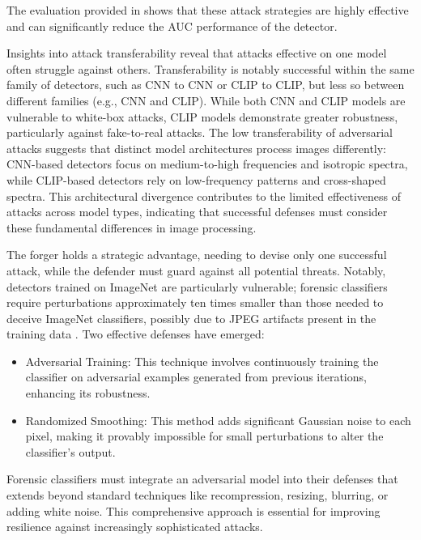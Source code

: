 \documentclass[conference]{IEEEtran} %
\begin{document}
        The evaluation provided in \cite{de2024exploring} shows that these attack strategies are highly effective and can significantly reduce the AUC performance of the detector.
        
        Insights into attack transferability \cite{de2024exploring} reveal that attacks effective on one model often struggle against others. Transferability is notably successful within the same family of detectors, such as CNN to CNN or CLIP to CLIP, but less so between different families (e.g., CNN and CLIP). While both CNN and CLIP models are vulnerable to white-box attacks, CLIP models demonstrate greater robustness, particularly against fake-to-real attacks.
        The low transferability of adversarial attacks suggests that distinct model architectures process images differently:
        CNN-based detectors focus on medium-to-high frequencies and isotropic spectra, while CLIP-based detectors rely on low-frequency patterns and cross-shaped spectra.
        This architectural divergence contributes to the limited effectiveness of attacks across model types, indicating that successful defenses must consider these fundamental differences in image processing.
        
        The forger holds a strategic advantage, needing to devise only one successful attack, while the defender must guard against all potential threats. Notably, detectors trained on ImageNet \cite{denglarge} are particularly vulnerable; forensic classifiers require perturbations approximately ten times smaller than those needed to deceive ImageNet classifiers, possibly due to JPEG artifacts present in the training data \cite{de2024exploring}.
        Two effective defenses have emerged:
        \begin{itemize}
            \item Adversarial Training: This technique involves continuously training the classifier on adversarial examples generated from previous iterations, enhancing its robustness.
            \item Randomized Smoothing: This method adds significant Gaussian noise to each pixel, making it provably impossible for small perturbations to alter the classifier's output.
        \end{itemize}
        
        Forensic classifiers must integrate an adversarial model into their defenses that extends beyond standard techniques like recompression, resizing, blurring, or adding white noise. This comprehensive approach is essential for improving resilience against increasingly sophisticated attacks.
\end{document}

